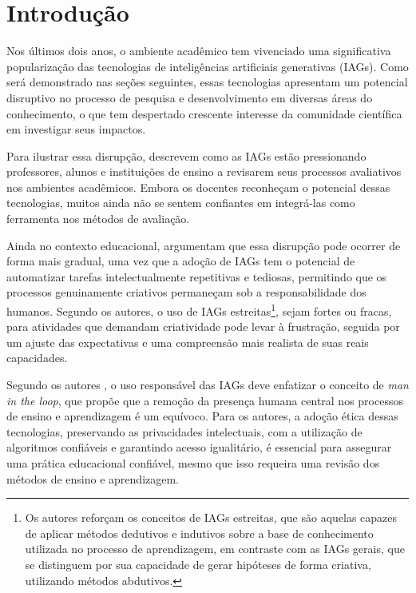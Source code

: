 \documentclass[openany,oneside,a4paper,11pt]{extarticle}
\begin{document}
\section{Introdução}
Nos últimos dois anos, o ambiente acadêmico tem vivenciado uma significativa popularização das tecnologias de inteligências artificiais generativas (IAGs). Como será demonstrado nas seções seguintes, essas tecnologias apresentam um potencial disruptivo no processo de pesquisa e desenvolvimento em diversas áreas do conhecimento, o que tem despertado crescente interesse da comunidade científica em investigar seus impactos.

Para ilustrar essa disrupção, \textcite{xia2024scoping} descrevem como as IAGs estão pressionando professores, alunos e instituições de ensino a revisarem seus processos avaliativos nos ambientes acadêmicos. Embora os docentes reconheçam o potencial dessas tecnologias, muitos ainda não se sentem confiantes em integrá-las como ferramenta nos métodos de avaliação.

Ainda no contexto educacional, \textcite{humble2019artificial} argumentam que essa disrupção pode ocorrer de forma mais gradual, uma vez que a adoção de IAGs tem o potencial de automatizar tarefas intelectualmente repetitivas e tediosas, permitindo que os processos genuinamente criativos permaneçam sob a responsabilidade dos humanos. Segundo os autores, o uso de IAGs estreitas\footnote{Os autores reforçam os conceitos de IAGs estreitas, que são aquelas capazes de aplicar métodos dedutivos e indutivos sobre a base de conhecimento utilizada no processo de aprendizagem, em contraste com as IAGs gerais, que se distinguem por sua capacidade de gerar hipóteses de forma criativa, utilizando métodos abdutivos.}, sejam fortes ou fracas, para atividades que demandam criatividade pode levar à frustração, seguida por um ajuste das expectativas e uma compreensão mais realista de suas reais capacidades.

Segundo os autores \textcite{ifenthaler2024artificial}, o uso responsável das IAGs deve enfatizar o conceito de \textit{man in the loop}, que propõe que a remoção da presença humana central nos processos de ensino e aprendizagem é um equívoco. Para os autores, a adoção ética dessas tecnologias, preservando as privacidades intelectuais, com a utilização de algoritmos confiáveis e garantindo acesso igualitário, é essencial para assegurar uma prática educacional confiável, mesmo que isso requeira uma revisão dos métodos de ensino e aprendizagem.
\end{document}
